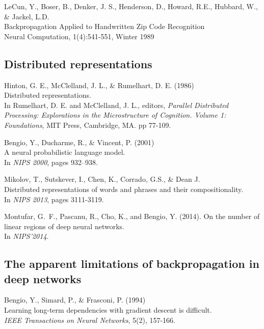 \documentclass[]{article}
\begin{document}
LeCun, Y., Boser, B., Denker, J. S., Henderson, D., Howard, R.E., Hubbard, W., \& Jackel, L.D.\\ 
Backpropagation Applied to Handwritten Zip Code Recognition\\
Neural Computation, 1(4):541-551, Winter 1989

\subsection{Distributed representations}
Hinton, G. E., McClelland, J. L., \& Rumelhart, D. E. (1986)\\ Distributed
representations.\\ In Rumelhart, D. E. and McClelland, J. L., editors, {\it
  Parallel Distributed Processing: Explorations in the Microstructure of
  Cognition. Volume 1: Foundations}, MIT Press, Cambridge, MA. pp 77-109.

Bengio, Y., Ducharme, R., \& Vincent, P. (2001)\\ A neural probabilistic
language model.\\ In {\it NIPS 2000}, pages 932--938.


Mikolov, T., Sutskever, I., Chen, K., Corrado, G.S., \& Dean J.\\
Distributed representations of words and phrases and their compositionality.\\
In {\it NIPS 2013}, pages 3111-3119.

Montufar, G.~F., Pascanu, R., Cho, K., and Bengio, Y. (2014).  On the number of
linear regions of deep neural networks.\\ In {\it NIPS'2014}.

\subsection{The apparent limitations of backpropagation in deep networks}

Bengio, Y., Simard, P., \& Frasconi, P. (1994)\\ Learning long-term dependencies
with gradient descent is difficult.\\ {\it IEEE Transactions on Neural
  Networks}, 5(2), 157-166.
\end{document}
